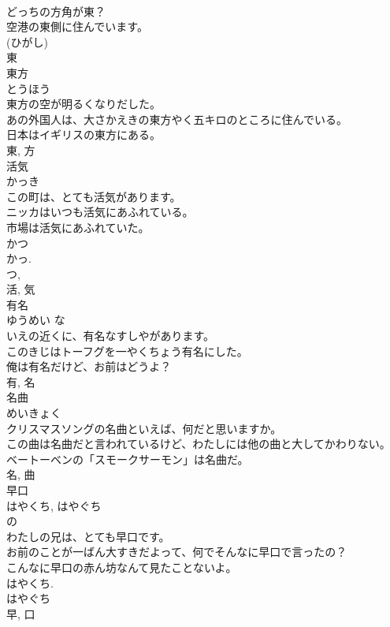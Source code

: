 \documentclass[8pt]{extreport}
\begin{document}
\begin{CJK}{UTF8}{min}
\\	どっちの方角が東？	
\\	空港の東側に住んでいます。	
\\	(ひがし) 
\\	東	
\\	東方	
\\	とうほう	
\\	東方の空が明るくなりだした。	
\\	あの外国人は、大さかえきの東方やく五キロのところに住んでいる。	
\\	日本はイギリスの東方にある。	
\\	東, 方	
\\	活気	
\\	かっき	
\\	この町は、とても活気があります。	
\\	ニッカはいつも活気にあふれている。	
\\	市場は活気にあふれていた。	
\\	かつ 
\\	かっ. 
\\	つ, 
\\	活, 気	
\\	有名	
\\	ゆうめい	な 
\\	いえの近くに、有名なすしやがあります。	
\\	このきじはトーフグを一やくちょう有名にした。	
\\	俺は有名だけど、お前はどうよ？	
\\	有, 名	
\\	名曲	
\\	めいきょく	
\\	クリスマスソングの名曲といえば、何だと思いますか。	
\\	この曲は名曲だと言われているけど、わたしには他の曲と大してかわりない。	
\\	ベートーベンの「スモークサーモン」は名曲だ。	
\\	名, 曲	
\\	早口	
\\	はやくち, はやぐち	
\\	の 
\\	わたしの兄は、とても早口です。	
\\	お前のことが一ばん大すきだよって、何でそんなに早口で言ったの？	
\\	こんなに早口の赤ん坊なんて見たことないよ。	
\\	はやくち. 
\\	はやぐち 
\\	早, 口	

\end{CJK}
\end{document}
